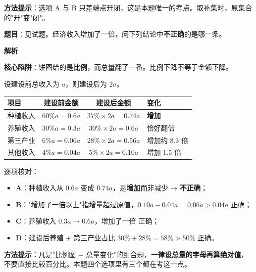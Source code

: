 
\begin{gktip}
\textbf{方法提示}：选项 A 与 B 只差端点开闭，这是本题唯一的考点。取补集时，原集合的"开"变"闭"。
\end{gktip}

\par\medskip


\textbf{题目}：见试题。经济收入增加了一倍，问下列结论中\textbf{不正确}的是哪一条。

\begin{center}\end{center}

\textbf{解析}

\textbf{核心陷阱}：饼图给的是\textbf{比例}，而总量翻了一番。比例下降不等于金额下降。

设建设前总收入为 $a$，则建设后为 $2a$。

\begin{center}
\begin{tabular}{lccl}
\toprule
项目 & 建设前金额 & 建设后金额 & 变化 \\
\midrule
种植收入 & $60\%a=0.6a$ & $37\%\times2a=0.74a$ & \textbf{增加} \\
养殖收入 & $30\%a=0.3a$ & $30\%\times2a=0.6a$ & 恰好翻倍 \\
第三产业 & $6\%a=0.06a$ & $28\%\times2a=0.56a$ & 增加约 $8.3$ 倍 \\
其他收入 & $4\%a=0.04a$ & $5\%\times2a=0.10a$ & 增加 $1.5$ 倍 \\
\bottomrule
\end{tabular}
\end{center}

逐项核对：

\begin{itemize}
\item \textbf{A}：种植收入从 $0.6a$ 变成 $0.74a$，是\textbf{增加}而非减少 → \textbf{不正确}；
\item \textbf{B}："增加了一倍以上"指增量超过原值，$0.10a-0.04a=0.06a>0.04a$  正确；
\item \textbf{C}：养殖收入 $0.3a\to0.6a$，增加了一倍  正确；
\item \textbf{D}：建设后养殖 $+$ 第三产业占比 $30\%+28\%=58\%>50\%$  正确。
\end{itemize}


\begin{gktip}
\textbf{方法提示}：凡是"比例图 + 总量变化"的组合题，\textbf{一律设总量的字母再算绝对值}，不要直接比较百分比。本题四个选项里有三个都在考这一点。
\end{gktip}

